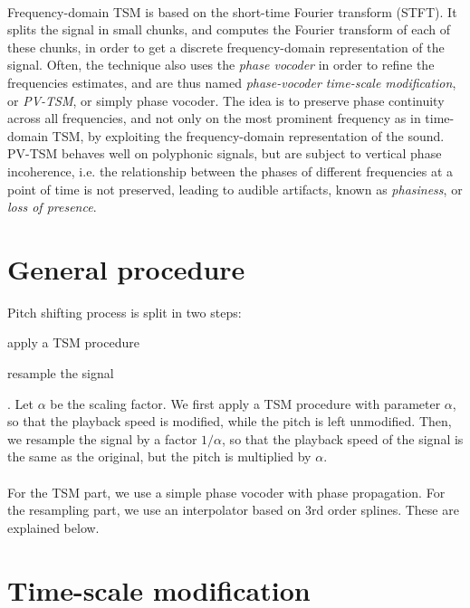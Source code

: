 \documentclass[letterpaper]{article}
\theoremstyle{definition}
\theoremstyle{remark}
\begin{document}
\paragraph{} Frequency-domain TSM is based on the short-time Fourier transform
(STFT). It splits the signal in small chunks, and computes the Fourier transform
of each of these chunks, in order to get a discrete frequency-domain
representation of the signal. Often, the technique also uses the \emph{phase
vocoder} in order to refine the frequencies estimates, and are thus named
\emph{phase-vocoder time-scale modification}, or \emph{PV-TSM}, or simply phase
vocoder. The idea is to preserve phase continuity across all frequencies, and
not only on the most prominent frequency as in time-domain TSM, by exploiting
the frequency-domain representation of the sound. PV-TSM behaves well on
polyphonic signals, but are subject to vertical phase incoherence, i.e. the
relationship between the phases of different frequencies at a point of time is
not preserved, leading to audible artifacts, known as \emph{phasiness}, or
\emph{loss of presence}.

\section{General procedure}
\label{sec:procedure}
Pitch shifting process is split in two steps: \begin{enumerate*}[label=\arabic*)]
\item apply a TSM procedure \item resample the signal\end{enumerate*}. Let
\(\alpha\) be the scaling factor. We first apply a TSM procedure with parameter
\(\alpha\), so that the playback speed is modified, while the pitch is left
unmodified. Then, we resample the signal by a factor \(1/\alpha\), so that the
playback speed of the signal is the same as the original, but the pitch is
multiplied by \(\alpha\).

\paragraph{}
For the TSM part, we use a simple phase vocoder with phase propagation. For the
resampling part, we use an interpolator based on 3rd order splines. These are
explained below.

\section{Time-scale modification}
\end{document}
